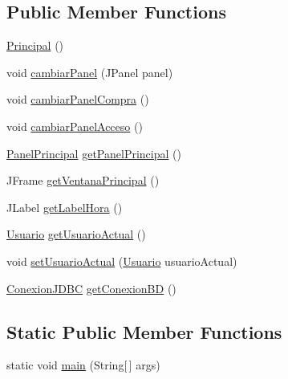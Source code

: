 \subsection*{Public Member Functions}
\begin{DoxyCompactItemize}
\item 
\mbox{\hyperlink{classvistas_1_1_principal_acf014fac1f15c33d980e722fe1e6d58f}{Principal}} ()
\item 
void \mbox{\hyperlink{classvistas_1_1_principal_a0f01204c3cdf3b88718a5f2c6a6d9ac9}{cambiar\+Panel}} (J\+Panel panel)
\item 
void \mbox{\hyperlink{classvistas_1_1_principal_aa6783bab03cc60f1bf401d4c16293318}{cambiar\+Panel\+Compra}} ()
\item 
void \mbox{\hyperlink{classvistas_1_1_principal_a0823d729a42c384bf4afd30b60a3e468}{cambiar\+Panel\+Acceso}} ()
\item 
\mbox{\hyperlink{classpaneles_1_1_panel_principal}{Panel\+Principal}} \mbox{\hyperlink{classvistas_1_1_principal_a546a7dca6785535d3f48f5a7b43c20a1}{get\+Panel\+Principal}} ()
\item 
J\+Frame \mbox{\hyperlink{classvistas_1_1_principal_afc2c81827c88c9c2494b3345264e747d}{get\+Ventana\+Principal}} ()
\item 
J\+Label \mbox{\hyperlink{classvistas_1_1_principal_a95e7bccba557226e9e56211a58a2e03c}{get\+Label\+Hora}} ()
\item 
\mbox{\hyperlink{classobjetos_1_1_usuario}{Usuario}} \mbox{\hyperlink{classvistas_1_1_principal_af7ea8d6ba599873466968add34233be0}{get\+Usuario\+Actual}} ()
\item 
void \mbox{\hyperlink{classvistas_1_1_principal_a6f45e56ee7c99715b798ff202bd57d7e}{set\+Usuario\+Actual}} (\mbox{\hyperlink{classobjetos_1_1_usuario}{Usuario}} usuario\+Actual)
\item 
\mbox{\hyperlink{classmysql_1_1_conexion_j_d_b_c}{Conexion\+J\+D\+BC}} \mbox{\hyperlink{classvistas_1_1_principal_ad7379276c979124d4386d01439f24b42}{get\+Conexion\+BD}} ()
\end{DoxyCompactItemize}
\subsection*{Static Public Member Functions}
\begin{DoxyCompactItemize}
\item 
static void \mbox{\hyperlink{classvistas_1_1_principal_a626dbf26bfdd3a03a2c1c99e34d25b6c}{main}} (String\mbox{[}$\,$\mbox{]} args)
\end{DoxyCompactItemize}


